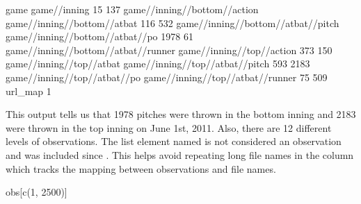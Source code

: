 \documentclass[a4paper]{report}\usepackage[]{graphicx}\usepackage[]{color}
\begin{document}
\begin{article}
\begin{Schunk}
\begin{Soutput}
                               game                        game//inning 
                                 15                                 137 
       game//inning//bottom//action         game//inning//bottom//atbat 
                                116                                 532 
 game//inning//bottom//atbat//pitch     game//inning//bottom//atbat//po 
                               1978                                  61 
game//inning//bottom//atbat//runner           game//inning//top//action 
                                373                                 150 
           game//inning//top//atbat     game//inning//top//atbat//pitch 
                                593                                2183 
       game//inning//top//atbat//po    game//inning//top//atbat//runner 
                                 75                                 509 
                            url_map 
                                  1 
\end{Soutput}
\end{Schunk}


This output tells us that 1978
pitches were thrown in the bottom inning and 2183
were thrown in the top inning on June 1st, 2011. Also, there are 12
different levels of observations. The list element named 
is not considered an observation and was included since .
This helps avoid repeating long file names in the 
column which tracks the mapping between observations and file names. 

\begin{Schunk}
\begin{Sinput}
obs[c(1, 2500)]
\end{Sinput}
\end{Schunk}
\end{article}
\end{document}
